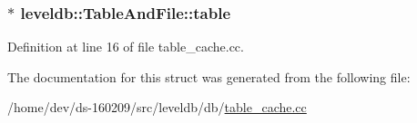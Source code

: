 \subsubsection[{table}]{$\ast$ leveldb\+::\+Table\+And\+File\+::table}\label{structleveldb_1_1_table_and_file_ab2df8b8a6c028cfcf36885fe76f48c99}


Definition at line 16 of file table\+\_\+cache.\+cc.



The documentation for this struct was generated from the following file\+:\begin{DoxyCompactItemize}
\item 
/home/dev/ds-\/160209/src/leveldb/db/\hyperlink{table__cache_8cc}{table\+\_\+cache.\+cc}\end{DoxyCompactItemize}
